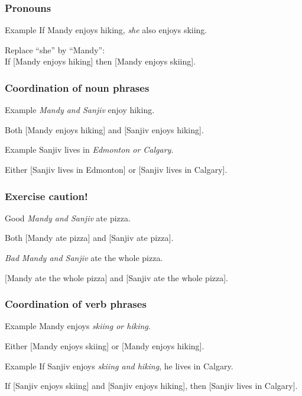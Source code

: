 \begin{frame}
  \frametitle{Pronouns}

  \begin{block}{Example}
    If Mandy enjoys hiking, \emph{she} also enjoys skiing.

    Replace ``she'' by ``Mandy'':\\
    If [Mandy enjoys hiking] then [Mandy enjoys skiing].
  \end{block}
\end{frame}

\begin{frame}
  \frametitle{Coordination of noun phrases}

  \begin{block}{Example}
    \emph{Mandy and Sanjiv} enjoy hiking.

    Both [Mandy enjoys hiking] and [Sanjiv enjoys hiking].
  \end{block}

  \begin{block}{Example}
    Sanjiv lives in \emph{Edmonton or Calgary}.

    Either [Sanjiv lives in Edmonton] or [Sanjiv lives in Calgary].
  \end{block}

\end{frame}

\begin{frame}
  \frametitle{Exercise caution!}

  \begin{block}{Good}
    \emph{Mandy and Sanjiv} ate pizza.

    Both [Mandy ate pizza] and [Sanjiv ate pizza].
  \end{block}

  \begin{block}{\emph{Bad}}
    \emph{Mandy and Sanjiv} ate the whole pizza.

    [Mandy ate the whole pizza] and [Sanjiv ate the whole pizza].
  \end{block}

\end{frame}

\begin{frame}
  \frametitle{Coordination of verb phrases}

  \begin{block}{Example}
  Mandy enjoys \emph{skiing or hiking}.

  Either [Mandy enjoys skiing] or [Mandy enjoys hiking].
  \end{block}

  \begin{block}{Example}
  If Sanjiv enjoys \emph{skiing and hiking}, he lives in Calgary.

  If [Sanjiv enjoys skiing] and [Sanjiv enjoys hiking], then [Sanjiv lives in Calgary].
  \end{block}

\end{frame}

